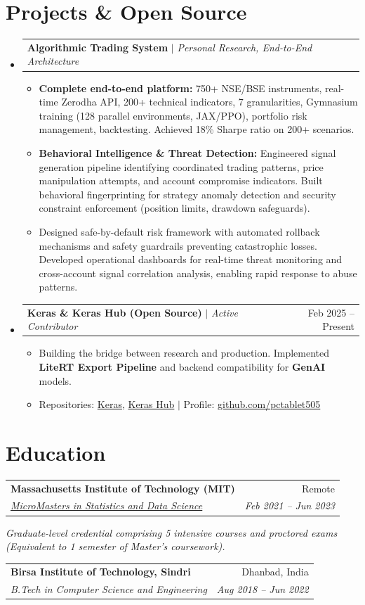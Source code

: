 \documentclass[10pt, letterpaper]{article}
\makeatletter
\newcommand{\resumeItem}[1]{
  \item\small{
    {#1 \vspace{-2pt}}
  }
}
\newcommand{\resumeSubheading}[4]{
  \vspace{-1pt}\item
    \begin{tabular*}{0.98\textwidth}[t]{l@{\extracolsep{\fill}}r}
      \textbf{#1} & {\small\color{darkgray} #2} \\
      \textit{\small#3} & \textit{\small\color{darkgray} #4} \\
    \end{tabular*}\vspace{-7pt}
}
\newcommand{\resumeProjectHeading}[2]{
    \item
    \begin{tabular*}{0.98\textwidth}{l@{\extracolsep{\fill}}r}
      \small#1 & #2 \\
    \end{tabular*}\vspace{-7pt}
}
\newcommand{\resumeSubHeadingListStart}{\begin{itemize}[leftmargin=0.15in, label={}]}
\newcommand{\resumeSubHeadingListEnd}{\end{itemize}}
\newcommand{\resumeItemListStart}{\begin{itemize}}
\newcommand{\resumeItemListEnd}{\end{itemize}\vspace{-5pt}}
\makeatother
\begin{document}
\section{Projects \& Open Source}
  \resumeSubHeadingListStart
    \resumeProjectHeading
      {\textbf{Algorithmic Trading System} $|$ \emph{Personal Research, End-to-End Architecture}}{}
      \resumeItemListStart
        \resumeItem{\textbf{Complete end-to-end platform:} 750+ NSE/BSE instruments, real-time Zerodha API, 200+ technical indicators, 7 granularities, Gymnasium training (128 parallel environments, JAX/PPO), portfolio risk management, backtesting. Achieved 18\% Sharpe ratio on 200+ scenarios.}
        \resumeItem{\textbf{Behavioral Intelligence \& Threat Detection:} Engineered signal generation pipeline identifying coordinated trading patterns, price manipulation attempts, and account compromise indicators. Built behavioral fingerprinting for strategy anomaly detection and security constraint enforcement (position limits, drawdown safeguards).}
        \resumeItem{Designed safe-by-default risk framework with automated rollback mechanisms and safety guardrails preventing catastrophic losses. Developed operational dashboards for real-time threat monitoring and cross-account signal correlation analysis, enabling rapid response to abuse patterns.}
      \resumeItemListEnd

    \resumeProjectHeading
      {\textbf{Keras \& Keras Hub (Open Source)} $|$ \emph{Active Contributor}}{Feb 2025 -- Present}
      \resumeItemListStart
        \resumeItem{Building the bridge between research and production. Implemented \textbf{LiteRT Export Pipeline} and backend compatibility for \textbf{GenAI} models.}
        \resumeItem{Repositories: \href{https://github.com/keras-team/keras}{Keras}, \href{https://github.com/keras-team/keras-hub}{Keras Hub} $|$ Profile: \href{https://github.com/pctablet505}{\color{midnightblue}github.com/pctablet505}}
      \resumeItemListEnd
      
  \resumeSubHeadingListEnd

\section{Education}
  \resumeSubHeadingListStart
    \resumeSubheading
      {Massachusetts Institute of Technology (MIT)}{Remote}
      {\href{https://micromasters.mit.edu/ds}{MicroMasters in Statistics and Data Science}}{Feb 2021 -- Jun 2023}
      \vspace{-4pt}
      \small{\item{\textit{Graduate-level credential comprising 5 intensive courses and proctored exams (Equivalent to 1 semester of Master's coursework).}}}
    \resumeSubheading
      {Birsa Institute of Technology, Sindri}{Dhanbad, India}
      {B.Tech in Computer Science and Engineering}{Aug 2018 -- Jun 2022}
  \resumeSubHeadingListEnd
\end{document}
